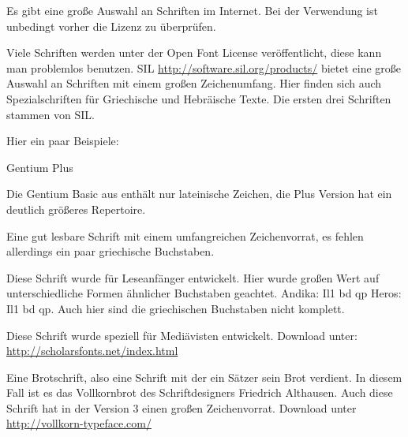 \iffalse
{}

\newfontfamily{}
\newfontfamily{}
\newfontfamily{}
\newfontfamily{}
\newfontfamily{}

Es gibt eine große Auswahl an Schriften im Internet.
Bei der Verwendung ist unbedingt vorher die Lizenz zu überprüfen.

Viele Schriften werden unter der Open Font License veröffentlicht, diese kann man problemlos benutzen.
SIL \url{http://software.sil.org/products/} bietet eine große Auswahl an Schriften mit einem großen Zeichenumfang.
Hier finden sich auch Spezialschriften für Griechische und Hebräische Texte.
Die ersten drei Schriften stammen von SIL.

Hier ein paar Beispiele:

\begin{labeling}{Gentium Plus}
\item[Gentium Plus] Die Gentium Basic aus \TeXLive{} enthält nur lateinische Zeichen, 
    die Plus Version hat ein deutlich größeres Repertoire.
\item[Charis SIL] Eine gut lesbare Schrift mit einem umfangreichen Zeichenvorrat, 
    es fehlen allerdings ein paar griechische Buchstaben. 
\item[Andika] Diese Schrift wurde für Leseanfänger entwickelt. 
    Hier wurde großen Wert auf unterschiedliche Formen ähnlicher Buchstaben geachtet.
    Andika: {\ABfont Il1 bd qp} Heros: {\HEfont Il1 bd qp}.
    Auch hier sind die griechischen Buchstaben nicht komplett.
\item[Cardo] Diese Schrift wurde speziell für Mediävisten entwickelt. 
 Download unter: \url{http://scholarsfonts.net/index.html}
\item[Vollkorn] Eine Brotschrift, also eine Schrift mit der ein Sätzer sein Brot verdient. 
    In diesem Fall ist es das Vollkornbrot des Schriftdesigners Friedrich Althausen.
    Auch diese Schrift hat in der Version 3 einen großen Zeichenvorrat. 
    Download unter \url{http://vollkorn-typeface.com/}
\end{labeling}

